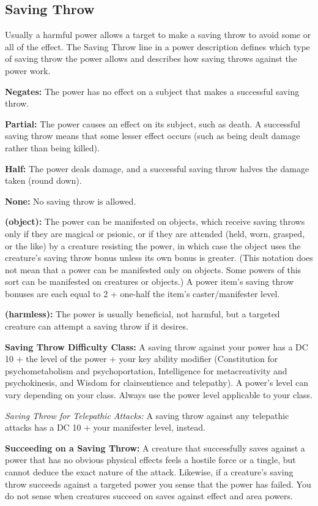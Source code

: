 \subsection{Saving Throw}
Usually a harmful power allows a target to make a saving throw to avoid some or all of the effect. The Saving Throw line in a power description defines which type of saving throw the power allows and describes how saving throws against the power work.

\textbf{Negates:} The power has no effect on a subject that makes a successful saving throw.

\textbf{Partial:} The power causes an effect on its subject, such as death. A successful saving throw means that some lesser effect occurs (such as being dealt damage rather than being killed).

\textbf{Half:} The power deals damage, and a successful saving throw halves the damage taken (round down).

\textbf{None:} No saving throw is allowed.

\textbf{(object):} The power can be manifested on objects, which receive saving throws only if they are magical or psionic, or if they are attended (held, worn, grasped, or the like) by a creature resisting the power, in which case the object uses the creature's saving throw bonus unless its own bonus is greater. (This notation does not mean that a power can be manifested only on objects. Some powers of this sort can be manifested on creatures or objects.) A power item's saving throw bonuses are each equal to 2 + one-half the item's caster/manifester level.

\textbf{(harmless):} The power is usually beneficial, not harmful, but a targeted creature can attempt a saving throw if it desires.

\textbf{Saving Throw Difficulty Class:} A saving throw against your power has a DC 10 + the level of the power + your key ability modifier (Constitution for psychometabolism and psychoportation, Intelligence for metacreativity and psychokinesis, and Wisdom for clairsentience and telepathy). A power's level can vary depending on your class. Always use the power level applicable to your class.

\textit{Saving Throw for Telepathic Attacks:} A saving throw against any telepathic attacks has a DC 10 + your manifester level, instead.

\textbf{Succeeding on a Saving Throw:} A creature that successfully saves against a power that has no obvious physical effects feels a hostile force or a tingle, but cannot deduce the exact nature of the attack. Likewise, if a creature's saving throw succeeds against a targeted power you sense that the power has failed. You do not sense when creatures succeed on saves against effect and area powers.

